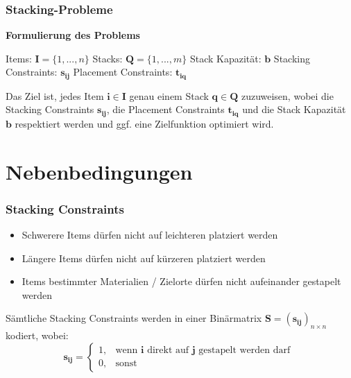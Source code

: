 \documentclass{beamer}
\begin{document}
\begin{frame}
\frametitle{Stacking-Probleme}

\textbf{Formulierung des Problems}\newline

Items: $\boldsymbol{I} = \{1, ..., n\}$\newline
Stacks: $\boldsymbol{Q} = \{1, ..., m\}$\newline
Stack Kapazität: $\boldsymbol{b}$\newline
Stacking Constraints: $\boldsymbol{s_{ij}}$\newline
Placement Constraints: $\boldsymbol{t_{iq}}$\newline

Das Ziel ist, jedes Item $\boldsymbol{i} \in \boldsymbol{I}$ genau einem Stack $\boldsymbol{q} \in \boldsymbol{Q}$ zuzuweisen,
wobei die Stacking Constraints $\boldsymbol{s_{ij}}$, die Placement Constraints $\boldsymbol{t_{iq}}$ und die Stack Kapazität $\boldsymbol{b}$ respektiert werden und ggf. eine Zielfunktion optimiert wird.
\end{frame}

\section{Nebenbedingungen}

\begin{frame}
\frametitle{Stacking Constraints}
\begin{itemize}
    \item Schwerere Items dürfen nicht auf leichteren platziert werden
    \item Längere Items dürfen nicht auf kürzeren platziert werden
    \item Items bestimmter Materialien / Zielorte dürfen nicht aufeinander gestapelt werden\newline
\end{itemize}
Sämtliche Stacking Constraints werden in einer Binärmatrix $\boldsymbol{S} = (\boldsymbol{s_{ij}})_{n \times n}$ kodiert, wobei:
\[
    \boldsymbol{s_{ij}} =
\begin{cases}
    1, & \text{wenn $\boldsymbol{i}$ direkt auf $\boldsymbol{j}$ gestapelt werden darf }\\
    0, & \text{sonst}
\end{cases}
\]
\end{frame}
\end{document}
